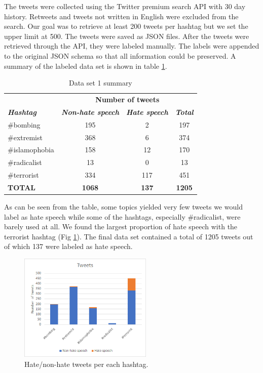 \documentclass[conference]{IEEEtran}
\begin{document}
The tweets were collected using the Twitter premium search API with 30 day history. Retweets 
and tweets not written in English were excluded from the search. Our goal was to retrieve at least 
200 tweets per hashtag but we set the upper limit at 500. The tweets were saved as JSON files. 
After the tweets were retrieved through the API, they were labeled manually. The labels were appended  
to the original JSON schema so that all information could be preserved. 
A summary of the labeled data set is shown in table 
\ref{tab:data_set_1_summary}.

\begin{table}[!ht]
    \def\arraystretch{1.2}%
    \begin{center}
      \caption{Data set 1 summary}
      \label{tab:data_set_1_summary}
      \begin{tabular}{l c c c}
        \hline
        &\multicolumn{3}{c}{\textbf{Number of tweets}} \\
        \textbf{\textit{Hashtag}}& \textbf{\textit{Non-hate speech}}& \textbf{\textit{Hate speech}} & \textbf{\textit{Total}}  \\
        \cline{2-4} 
        \hline
        \#bombing & 195 & 2 & 197\\
        \#extremist & 368 & 6 & 374\\
        \#islamophobia & 158 & 12 & 170\\
        \#radicalist & 13 & 0 & 13\\
        \#terrorist & 334 & 117 & 451\\
        \hline
        \textbf{TOTAL} & \textbf{1068} & \textbf{137} & \textbf{1205}\\
        \hline
      \end{tabular}  
    \end{center}
  \end{table}

As can be seen from the table, some topics yielded very few tweets we would label as hate speech 
while some of the hashtags, especially \#radicalist, were barely used at all. We found the largest
proportion of hate speech with the terrorist hashtag (Fig \ref{fig:data_set_1_summary}). The final 
data set contained a total of 1205 tweets out of which 137 were labeled as hate speech. 

\begin{figure}[htbp]
\centering
\centerline{\includegraphics[width=2.5in]{data_set_1_summary.png}}
\caption{Hate/non-hate tweets per each hashtag.}
\label{fig:data_set_1_summary}
\end{figure}
\end{document}
